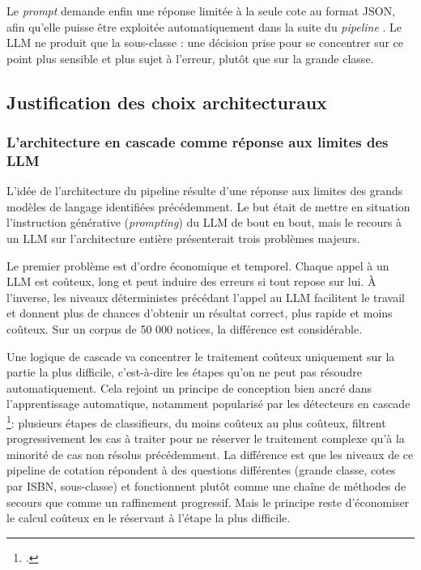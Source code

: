 Le \textit{prompt}  demande enfin une réponse limitée à la seule cote au format JSON, afin qu'elle puisse être exploitée automatiquement dans la suite du \textit{pipeline} . Le LLM ne produit que la sous-classe : une décision prise pour se concentrer sur ce point plus sensible et plus sujet à l'erreur, plutôt que sur la grande classe.


\subsection{Justification des choix architecturaux}
\label{sec:justification-architecture}

\subsubsection*{L'architecture en cascade comme réponse aux limites des LLM}

L'idée de l'architecture du pipeline résulte d'une réponse aux limites des grands modèles de langage identifiées précédemment. Le but était de mettre en situation l'instruction générative  (\textit{prompting}) du LLM de bout en bout, mais le recours à un LLM sur l'architecture entière présenterait trois problèmes majeurs.

Le premier problème est d'ordre économique et temporel. Chaque appel à un LLM est coûteux, long et peut induire des erreurs si tout repose sur lui. À l'inverse, les niveaux déterministes précédant l'appel au LLM facilitent le travail et donnent plus de chances d'obtenir un résultat correct, plus rapide et moins coûteux. Sur un corpus de 50 000 notices, la différence est considérable.

Une logique de cascade va concentrer le traitement coûteux uniquement sur la partie la plus difficile, c'est-à-dire les étapes qu'on ne peut pas résoudre automatiquement. Cela rejoint un principe de conception bien ancré dans l'apprentissage automatique, notamment popularisé par les détecteurs en cascade \footcite{violajones2001}: plusieurs étapes de classifieurs, du moins coûteux au plus coûteux, filtrent progressivement les cas à traiter pour ne réserver le traitement complexe qu'à la minorité de cas non résolus précédemment. La différence est que les niveaux de ce pipeline de cotation répondent à des questions différentes (grande classe, cotes par ISBN, sous-classe) et fonctionnent plutôt comme une chaîne de méthodes de secours que comme un raffinement progressif. Mais le principe reste d'économiser le calcul coûteux en le réservant à l'étape la plus difficile.

